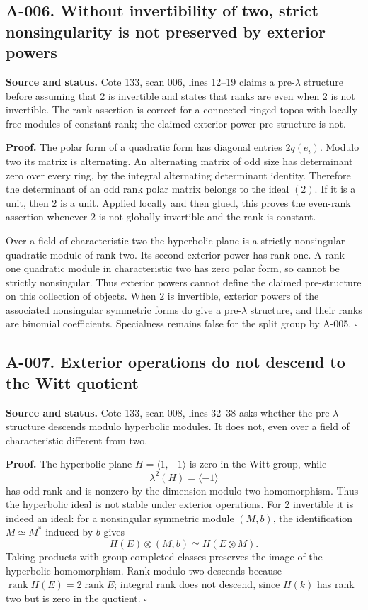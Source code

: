 \subsection*{A-006. Without invertibility of two, strict nonsingularity is not preserved by exterior powers}
\textbf{Source and status.} Cote 133, scan 006, lines 12--19 claims a
pre-$\lambda$ structure before assuming that $2$ is invertible and states
that ranks are even when $2$ is not invertible.  The rank assertion is
correct for a connected ringed topos with locally free modules of
constant rank; the claimed exterior-power pre-structure is not.

\textbf{Proof.} The polar form of a quadratic form has diagonal entries
$2q(e_i)$.  Modulo two its matrix is alternating.  An alternating matrix
of odd size has determinant zero over every ring, by the integral
alternating determinant identity.  Therefore the determinant of an odd
rank polar matrix belongs to the ideal $(2)$.  If it is a unit, then
$2$ is a unit.  Applied locally and then glued, this proves the even-rank
assertion whenever $2$ is not globally invertible and the rank is
constant.

Over a field of characteristic two the hyperbolic plane is a strictly
nonsingular quadratic module of rank two.  Its second exterior power
has rank one.  A rank-one quadratic module in characteristic two has
zero polar form, so cannot be strictly nonsingular.  Thus exterior
powers cannot define the claimed pre-structure on this collection of
objects.  When $2$ is invertible, exterior powers of the associated
nonsingular symmetric forms do give a pre-$\lambda$ structure, and
their ranks are binomial coefficients.  Specialness remains false for
the split group by A-005. \hfill$\square$

\subsection*{A-007. Exterior operations do not descend to the Witt quotient}
\textbf{Source and status.} Cote 133, scan 008, lines 32--38 asks whether
the pre-$\lambda$ structure descends modulo hyperbolic modules.  It does
not, even over a field of characteristic different from two.

\textbf{Proof.} The hyperbolic plane $H=\langle1,-1\rangle$ is zero in
the Witt group, while
\[
 \lambda^2(H)=\langle-1\rangle
\]
has odd rank and is nonzero by the dimension-modulo-two homomorphism.
Thus the hyperbolic ideal is not stable under exterior operations.
For $2$ invertible it is indeed an ideal: for a nonsingular symmetric
module $(M,b)$, the identification $M\simeq M^*$ induced by $b$ gives
\[
 H(E)\otimes(M,b)\simeq H(E\otimes M).
\]
Taking products with group-completed classes preserves the image of
the hyperbolic homomorphism.  Rank modulo two descends because
$\operatorname{rank}H(E)=2\operatorname{rank}E$; integral rank does
not descend, since $H(k)$ has rank two but is zero in the quotient.
\hfill$\square$

